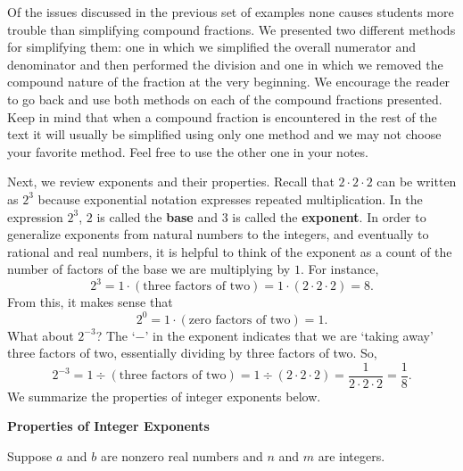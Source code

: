 \documentclass{ximera}
\begin{document}
Of the issues discussed in the previous set of examples none causes students more trouble than simplifying compound fractions.  We presented two different methods for simplifying them:  one in which we simplified the overall numerator and denominator and then performed the division and one in which we removed the compound nature of the fraction at the very beginning.   We encourage the reader to go back and use both methods on each of the compound fractions presented.  Keep in mind that when a compound fraction is encountered in the rest of the text it will usually be simplified using only one method and we may not choose your favorite method.  Feel free to use the other one in your notes.

\smallskip

Next, we review exponents and their properties.  Recall that $2 \cdot 2 \cdot 2$  can be written as $2^3$ because exponential notation expresses repeated multiplication.  In the expression $2^3$, $2$ is called the \textbf{base} and $3$ is called the \textbf{exponent}. In order to generalize exponents from natural numbers to the integers, and eventually to rational and real numbers, it is helpful to think of the exponent as a count of the number of factors of the base we are multiplying by $1$.  For instance, \[2^3 = 1 \cdot (\text{three factors of two}) = 1 \cdot (2 \cdot 2 \cdot 2) = 8.\] From this, it makes sense that \[2^{0} = 1 \cdot (\text{zero factors of two}) = 1.\]  What about $2^{-3}$?  The `$-$' in the exponent indicates that we are `taking away' three factors of two, essentially dividing by three factors of two.  So, \[2^{-3} = 1 \div (\text{three factors of two}) = 1 \div (2 \cdot 2 \cdot 2) = \frac{1}{2 \cdot 2 \cdot 2} = \frac{1}{8}.\]  We summarize the properties of integer exponents below.

\medskip

\label{propertiesofintegerexponents}


\centerline{\textbf{Properties of Integer Exponents}}

\vspace{.05in}

Suppose $a$ and $b$ are nonzero real numbers and $n$ and $m$ are integers.
\end{document}
